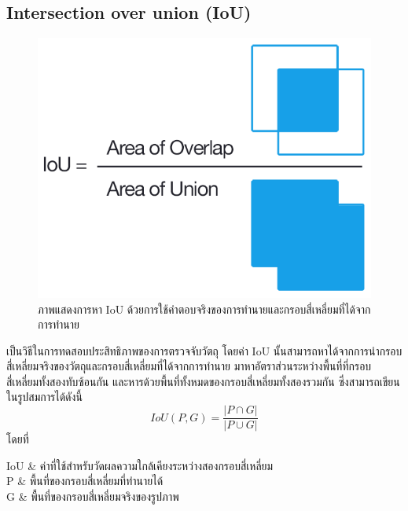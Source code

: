 \subsection*{Intersection over union (IoU)}
\begin{figure}[!ht]
	\centering
	\includegraphics[scale=0.3]{chapter2/images/iou_equation.png}
		\caption{ภาพแสดงการหา IoU ด้วยการใช้คำตอบจริงของการทำนายและกรอบสี่เหลี่ยมที่ได้จากการทำนาย}
    	\label{fig:iou_equation}
\end{figure}
เป็นวิธีในการทดสอบประสิทธิภาพของการตรวจจับวัตถุ โดยค่า IoU นั้นสามารถหาได้จากการนำกรอบสี่เหลี่ยมจริงของวัตถุและกรอบสี่เหลี่ยมที่ได้จากการทำนาย
มาหาอัตราส่วนระหว่างพื้นที่ที่กรอบสี่เหลี่ยมทั้งสองทับซ้อนกัน และหารด้วยพื้นที่ทั้งหมดของกรอบสี่เหลี่ยมทั้งสองรวมกัน ซึ่งสามารถเขียนในรูปสมการได้ดังนี้
\begin{equation}
IoU(P,G) = \frac{\left| P \cap G \right|}{\left| P \cup  G \right|}					
\end{equation}
โดยที่
\begin{conditions}
IoU			&  ค่าที่ใช้สำหรับวัดผลความใกล้เคียงระหว่างสองกรอบสี่เหลี่ยม    \\
P			&  พื้นที่ของกรอบสี่เหลี่ยมที่ทำนายได้	\\
G			&  พื้นที่ของกรอบสี่เหลี่ยมจริงของรูปภาพ					\\
\end{conditions}

